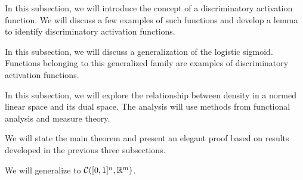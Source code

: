 \begin{description}[noitemsep]
\item[\nameref{subsection:universality:cybenko:1}] In this subsection, we will introduce the concept of a discriminatory activation function. We will discuss a few examples of such functions and develop a lemma to identify discriminatory activation functions.
\item[\nameref{subsection:universality:cybenko:2}] In this subsection, we will discuss a generalization of the logistic sigmoid. Functions belonging to this generalized family are examples of discriminatory activation functions.
\item[\nameref{subsection:universality:cybenko:3}] In this subsection, we will explore the relationship between density in a normed linear space and its dual space. The analysis will use methods from functional analysis and measure theory.
\item[\nameref{subsection:universality:cybenko:4}] We will state the main theorem and present an elegant proof based on results developed in the previous three subsections. 
\item[\nameref{subsection:universality:cybenko:5}] We will generalize  to ${\mathcal C}([0,1]^n, {\mathbb R}^m)$.
\end{description}




